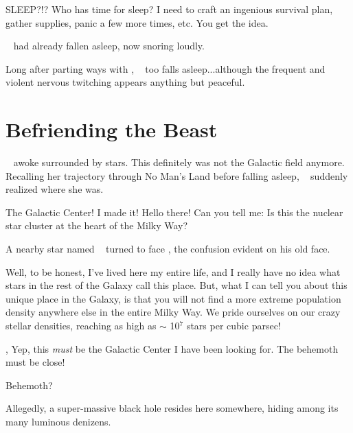 \documentclass[main.tex]{subfiles}
\begin{document}
\par \Electra SLEEP?!?  Who has time for sleep?  I need to craft an ingenious survival plan, gather supplies, panic a few more times, etc.  You get the idea.  

\par \rmdardanus~ had already fallen asleep, now snoring loudly.

\par \nar Long after parting ways with \rmdardanus, \rmelectra~ too falls asleep...although the frequent and violent nervous twitching appears anything but peaceful.

\section{Befriending the Beast} \label{beast}

\par \nar \rmelectra~ awoke surrounded by stars.  This definitely was not the Galactic field anymore.  Recalling her trajectory through No Man's Land before falling asleep, \rmelectra~ suddenly realized where she was.

\par \Electra The Galactic Center!  I made it!  Hello there!  Can you tell me:  Is this the nuclear star cluster at the heart of the Milky Way?

\par \nar A nearby star named \rmcarystus~ turned to face \rmelectra, the confusion evident on his old face.  

\par \Carystus Well, to be honest, I've lived here my entire life, and I really have no idea what stars in the rest of the Galaxy call this place.  But, what I can tell you about this unique place in the Galaxy, is that you will not find a more extreme population density anywhere else in the entire Milky Way.  We pride ourselves on our crazy stellar densities, reaching as high as $\sim$ 10$^7$ stars per cubic parsec!

\par \Electra, Yep, this \textit{must} be the Galactic Center I have been looking for.  The behemoth must be close!

\par \Carystus Behemoth?

\par \Electra Allegedly, a super-massive black hole resides here somewhere, hiding among its many luminous denizens.
\end{document}
